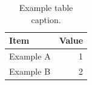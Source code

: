 \begin{table}[htbp]
  \centering
  \caption{Example table caption.}
  \label{tab:example}
  \begin{tabular}{lr}
    \hline
    Item & Value \\
    \hline
    Example A & 1 \\
    Example B & 2 \\
    \hline
  \end{tabular}
\end{table}

